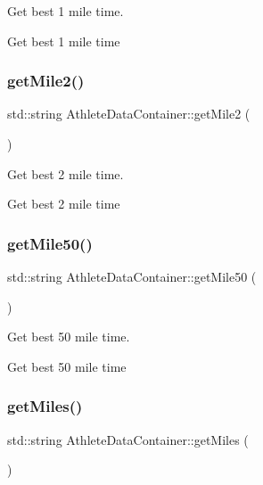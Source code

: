Get best 1 mile time. 

Get best 1 mile time \mbox{\label{classAthleteDataContainer_abcf699931e5bc100542e3272da41a61d}} 
\subsubsection{\texorpdfstring{getMile2()}{getMile2()}}
{\footnotesize\ttfamily std\+::string Athlete\+Data\+Container\+::get\+Mile2 (\begin{DoxyParamCaption}{ }\end{DoxyParamCaption})}



Get best 2 mile time. 

Get best 2 mile time \mbox{\label{classAthleteDataContainer_ac80fd37eff39d59c11cc0b6fb5e07423}} 
\subsubsection{\texorpdfstring{getMile50()}{getMile50()}}
{\footnotesize\ttfamily std\+::string Athlete\+Data\+Container\+::get\+Mile50 (\begin{DoxyParamCaption}{ }\end{DoxyParamCaption})}



Get best 50 mile time. 

Get best 50 mile time \mbox{\label{classAthleteDataContainer_a6c2eae055dab923923bea0226e557baa}} 
\subsubsection{\texorpdfstring{getMiles()}{getMiles()}}
{\footnotesize\ttfamily std\+::string Athlete\+Data\+Container\+::get\+Miles (\begin{DoxyParamCaption}{ }\end{DoxyParamCaption})}



